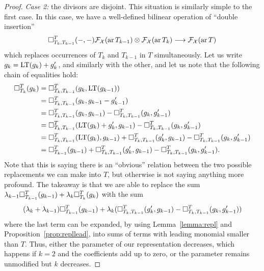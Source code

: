 \begin{proof}
\emph{Case 2:} the divisors are disjoint.  This situation
is similarly simple to the first case. In this case, we have
a well-defined bilinear operation of ``double insertion''
\[
\square_{T_k,T_{k-1}}^{T}(-,-) \mathcal{F}_{\mathcal{X}}(\operatorname{ar}{T_{k-1}})\otimes \mathcal{F}_{\mathcal{X}}(\operatorname{ar}{T_{k}}) 
\longrightarrow \mathcal{F}_{\mathcal{X}}(\operatorname{ar}{T})
\]
which replaces occurrences of $T_k$ and $T_{k-1}$ in 
$T$ simultaneously.
Let us write $g_k  = \operatorname{LT}(g_k) + g_k'$, and similarly
with the other, and let us note that the following chain of
equalities hold:
\begin{align*}
\square_{T_k}^{T}(g_k) 
	&= \square_{T_k,T_{k-1}}^{T}(g_k,\operatorname{LT}(g_{k-1}))   \\
	&= \square_{T_k,T_{k-1}}^{T}(g_k,g_{k-1}-g_{k-1}')	\\
		&=\square_{T_k,T_{k-1}}^{T}(g_k,g_{k-1})	- \square_{T_k,T_{k-1}}^{T}(g_k,g_{k-1}')	\\
		&=\square_{T_k,T_{k-1}}^{T}(\operatorname{LT}(g_k)+g_k',g_{k-1})	- \square_{T_k,T_{k-1}}^{T}(g_k,g_{k-1}')	\\
			&=\square_{T_k,T_{k-1}}^{T}(\operatorname{LT}(g_k),g_{k-1})
			+\square_{T_k,T_{k-1}}^{T}(g_k',g_{k-1})
				- \square_{T_k,T_{k-1}}^{T}(g_k,g_{k-1}')	\\
		&=\square_{T_{k-1}}^{T}(g_{k-1})
			+\square_{T_k,T_{k-1}}^{T}(g_k',g_{k-1})
				- \square_{T_k,T_{k-1}}^{T}(g_k,g_{k-1}').
\end{align*}
Note that this is saying there is an ``obvious'' relation
between the two possible replacements we can make into $T$,
but otherwise is not saying anything more profound. The takeaway
is that we are able to replace the sum 
$\lambda_{k-1}\square_{T_{k-1}}^{T}(g_{k-1}) + 
\lambda_k\square_{T_{k}}^{T}(g_{k}) $ with the sum
\[ 
(\lambda_k + \lambda_{k-1})\square_{T_{k-1}}^{T}(g_{k-1}) + 	
\lambda_{k}(\square_{T_k,T_{k-1}}^{T}(g_k',g_{k-1})
				- \square_{T_k,T_{k-1}}^{T}(g_k,g_{k-1}'))
\]
where the last term can be expanded, by using Lemma~\ref{lemma:repl}
and Proposition~\ref{prop:repllead}, into sums of terms
with leading monomial smaller than $T$. Thus, either
the parameter of our representation decreases, which
happens if $k=2$ and the coefficients add up to zero,
or the parameter remains unmodified but $k$ decreases.


\end{proof}
